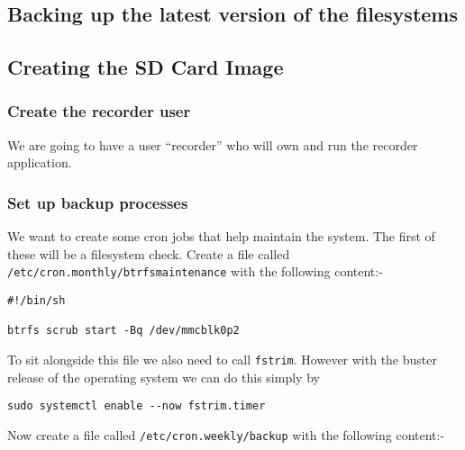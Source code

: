 \documentclass[Draft]{akc}
\begin{document}
\subsection{Backing up the latest version of the filesystems}

\subsection{Creating the SD Card Image}












\subsubsection{Create the recorder user}

We are going to have a user ``recorder'' who will own and run the recorder application.  
\subsubsection{Set up backup processes}

We want to create some cron jobs that help maintain the system.  The first of these will be a
filesystem check.  Create a file called \texttt{/etc/cron.monthly/btrfsmaintenance} with the
following content:-

\begin{lstlisting}
#!/bin/sh

btrfs scrub start -Bq /dev/mmcblk0p2

\end{lstlisting}

To sit alongside this file we also need to call \texttt{fstrim}.  However with the buster release of
the operating system we can do this simply by
\begin{lstlisting}
sudo systemctl enable --now fstrim.timer
\end{lstlisting}

Now create a file called \texttt{/etc/cron.weekly/backup} with the following content:-
\end{document}

